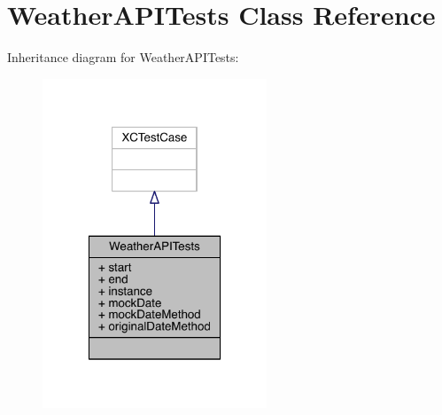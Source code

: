 \hypertarget{interface_weather_a_p_i_tests}{\section{Weather\-A\-P\-I\-Tests Class Reference}
\label{interface_weather_a_p_i_tests}
}


Inheritance diagram for Weather\-A\-P\-I\-Tests\-:\nopagebreak
\begin{figure}[H]
\begin{center}
\leavevmode
\includegraphics[width=190pt]{interface_weather_a_p_i_tests__inherit__graph}
\end{center}
\end{figure}


